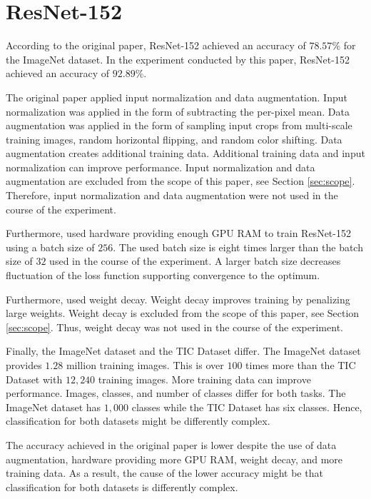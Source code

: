 \section{ResNet-152}
According to the original paper, ResNet-152 achieved an accuracy of $78.57 \%$ for the ImageNet dataset. \autocite{He.2016} In the experiment conducted by this paper, ResNet-152 achieved an accuracy of $92.89 \%$.
\par
The original paper applied input normalization and data augmentation. Input normalization was applied in the form of subtracting the per-pixel mean. Data augmentation was applied in the form of sampling input crops from multi-scale training images, random horizontal flipping, and random color shifting. \autocite{He.2016}
Data augmentation creates additional training data. Additional training data and input normalization can improve performance. \autocite{ElAmir.2020} Input normalization and data augmentation are excluded from the scope of this paper, see Section \ref{sec:scope}. Therefore, input normalization and data augmentation were not used in the course of the experiment. 
\par
Furthermore, \cite{He.2016} used hardware providing enough GPU RAM to train ResNet-152 using a batch size of $256$. The used batch size is eight times larger than the batch size of $32$ used in the course of the experiment. A larger batch size decreases fluctuation of the loss function supporting convergence to the optimum. \autocite{Ruder.2016}
\par
Furthermore, \cite{He.2016} used weight decay. Weight decay improves training by penalizing large weights. \autocite{ElAmir.2020} Weight decay is excluded from the scope of this paper, see Section \ref{sec:scope}. Thus, weight decay was not used in the course of the experiment. 
\par
Finally, the ImageNet dataset and the \ac{TIC Dataset} differ. The ImageNet dataset provides $1.28$ million training images. This is over $100$ times more than the \ac{TIC Dataset} with $12{,}240$ training images. \autocite{He.2016} More training data can improve performance. \autocite{ElAmir.2020} Images, classes, and number of classes differ for both tasks. The ImageNet dataset has $1{,}000$ classes while the \ac{TIC Dataset} has six classes. Hence, classification for both datasets might be differently complex.
\par
The accuracy achieved in the original paper is lower despite the use of data augmentation, hardware providing more GPU RAM, weight decay, and more training data. As a result, the cause of the lower accuracy might be that classification for both datasets is differently complex.


